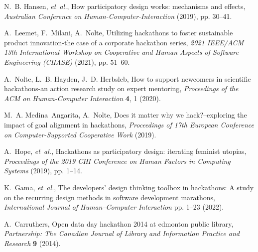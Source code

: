 \documentclass{ieeeaccess}
\begin{document}
\begin{thebibliography}{10}
N.~B. Hansen, {\it et~al.\/}, How participatory design works: mechanisms and
  effects, {\it Australian Conference on Human-Computer-Interaction\/} (2019),
  pp. 30--41.

A.~Leemet, F.~Milani, A.~Nolte, Utilizing hackathons to foster sustainable
  product innovation-the case of a corporate hackathon series, {\it 2021
  IEEE/ACM 13th International Workshop on Cooperative and Human Aspects of
  Software Engineering (CHASE)\/} (2021), pp. 51--60.

A.~Nolte, L.~B. Hayden, J.~D. Herbsleb, How to support newcomers in scientific
  hackathons-an action research study on expert mentoring, {\it Proceedings of
  the ACM on Human-Computer Interaction\/} {\bf 4}, 1 (2020).

M.~A. Medina~Angarita, A.~Nolte, Does it matter why we hack?--exploring the
  impact of goal alignment in hackathons, {\it Proceedings of 17th European
  Conference on Computer-Supported Cooperative Work\/} (2019).

A.~Hope, {\it et~al.\/}, Hackathons as participatory design: iterating feminist
  utopias, {\it Proceedings of the 2019 CHI Conference on Human Factors in
  Computing Systems\/} (2019), pp. 1--14.

K.~Gama, {\it et~al.\/}, The developers’ design thinking toolbox in
  hackathons: A study on the recurring design methods in software development
  marathons, {\it International Journal of Human--Computer Interaction\/} pp.
  1--23 (2022).

A.~Carruthers, Open data day hackathon 2014 at edmonton public library, {\it
  Partnership: The Canadian Journal of Library and Information Practice and
  Research\/} {\bf 9} (2014).

\end{thebibliography}
\end{document}
